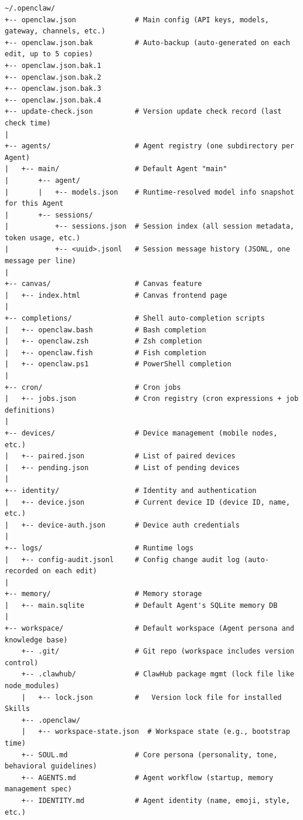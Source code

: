 \begin{lstlisting}
~/.openclaw/
+-- openclaw.json              # Main config (API keys, models, gateway, channels, etc.)
+-- openclaw.json.bak          # Auto-backup (auto-generated on each edit, up to 5 copies)
+-- openclaw.json.bak.1
+-- openclaw.json.bak.2
+-- openclaw.json.bak.3
+-- openclaw.json.bak.4
+-- update-check.json          # Version update check record (last check time)
|
+-- agents/                    # Agent registry (one subdirectory per Agent)
|   +-- main/                  # Default Agent "main"
|       +-- agent/
|       |   +-- models.json    # Runtime-resolved model info snapshot for this Agent
|       +-- sessions/
|           +-- sessions.json  # Session index (all session metadata, token usage, etc.)
|           +-- <uuid>.jsonl   # Session message history (JSONL, one message per line)
|
+-- canvas/                    # Canvas feature
|   +-- index.html             # Canvas frontend page
|
+-- completions/               # Shell auto-completion scripts
|   +-- openclaw.bash          # Bash completion
|   +-- openclaw.zsh           # Zsh completion
|   +-- openclaw.fish          # Fish completion
|   +-- openclaw.ps1           # PowerShell completion
|
+-- cron/                      # Cron jobs
|   +-- jobs.json              # Cron registry (cron expressions + job definitions)
|
+-- devices/                   # Device management (mobile nodes, etc.)
|   +-- paired.json            # List of paired devices
|   +-- pending.json           # List of pending devices
|
+-- identity/                  # Identity and authentication
|   +-- device.json            # Current device ID (device ID, name, etc.)
|   +-- device-auth.json       # Device auth credentials
|
+-- logs/                      # Runtime logs
|   +-- config-audit.jsonl     # Config change audit log (auto-recorded on each edit)
|
+-- memory/                    # Memory storage
|   +-- main.sqlite            # Default Agent's SQLite memory DB
|
+-- workspace/                 # Default workspace (Agent persona and knowledge base)
    +-- .git/                  # Git repo (workspace includes version control)
    +-- .clawhub/              # ClawHub package mgmt (lock file like node_modules)
    |   +-- lock.json          #   Version lock file for installed Skills
    +-- .openclaw/
    |   +-- workspace-state.json  # Workspace state (e.g., bootstrap time)
    +-- SOUL.md                # Core persona (personality, tone, behavioral guidelines)
    +-- AGENTS.md              # Agent workflow (startup, memory management spec)
    +-- IDENTITY.md            # Agent identity (name, emoji, style, etc.)

\end{lstlisting}
